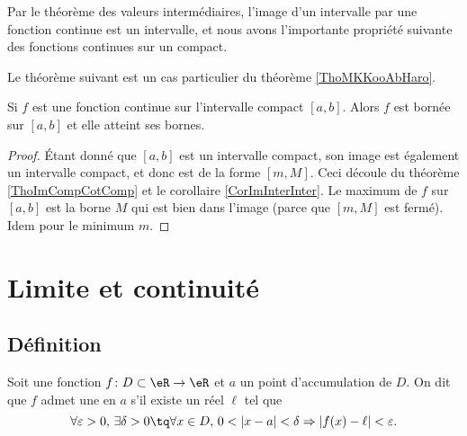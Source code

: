 Par le théorème des valeurs intermédiaires, l'image d'un intervalle par une fonction continue est un intervalle, et nous avons l'importante propriété suivante des fonctions continues sur un compact.

Le théorème suivant est un cas particulier du théorème \ref{ThoMKKooAbHaro}.
\begin{theorem}
    Si $f$ est une fonction continue sur l'intervalle compact $[a,b]$. Alors $f$ est bornée sur $[a,b]$ et elle atteint ses bornes.
\end{theorem}

\begin{proof}
    Étant donné que $[a,b]$ est un intervalle compact, son image est également un intervalle compact, et donc est de la forme $[m,M]$. Ceci découle du théorème \ref{ThoImCompCotComp} et le corollaire \ref{CorImInterInter}. Le maximum de $f$ sur $[a,b]$ est la borne $M$ qui est bien dans l'image (parce que $[m,M]$ est fermé). Idem pour le minimum $m$.
\end{proof}

\section{Limite et continuité}
\label{SecLimiteFontion}

\subsection{Définition}

\begin{proposition}       \label{PropAJQQooQQClfp}
	Soit une fonction $f\colon D\subset\eR\to \eR$ et $a$ un point d'accumulation de $D$. On dit que $f$ admet une  en $a$ s'il existe un réel $\ell$ tel que 
	\begin{equation}\label{EqDefLimiteFonction}
		\forall\varepsilon>0,\,\exists\delta>0\tq \forall x\in D,\, 0<| x-a |<\delta\Rightarrow| f(x)-\ell |<\varepsilon.
	\end{equation}
\end{proposition}

